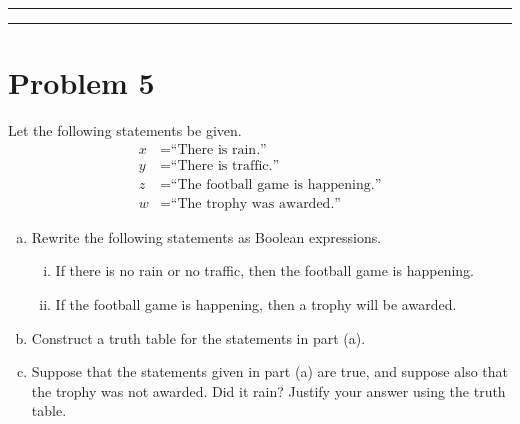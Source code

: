 \documentclass{article}
\theoremstyle{definition}
\newenvironment{solution}{\bigskip\hrule{\hfill}}{\bigskip\hrule{\hfill}} %
\begin{document}

\begin{solution}


\end{solution}


\newpage


\section*{Problem 5}

Let the following statements be given.
    \begin{align*}
        x & = \text{``There is rain.''}\\
	y & = \text{``There is traffic.''}\\
        z & = \text{``The football game is happening.''}\\
	w & = \text{``The trophy was awarded.''}
    \end{align*}
    \begin{enumerate}[a)] %
	\item Rewrite the following statements as Boolean expressions.
        \begin{enumerate}[i.] %
            \item If there is no rain or no traffic, then the football game is happening.
		\item If the football game is happening, then a trophy will be awarded.
	\end{enumerate}
	\item Construct a truth table for the statements in part (a).
	\item Suppose that the statements given in part (a) are true, and suppose also that the trophy was not awarded. Did it rain? Justify your answer using the truth table.
    \end{enumerate}
\end{document}
